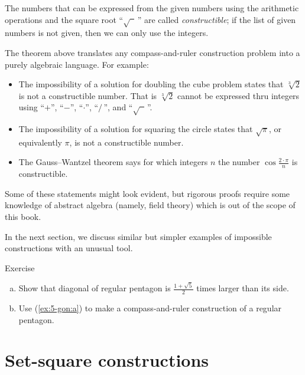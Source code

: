 The numbers that can be expressed from the given numbers using the arithmetic operations and the square root ``$\sqrt{\phantom{a}}\,$'' are called \emph{constructible};
if the list of given numbers is not given, then we can only use the integers.

{\sloppy
The theorem above translates any compass-and-ruler construction problem into a purely algebraic language.
For example:
\begin{itemize}
\item The impossibility of a solution for doubling the cube problem states that $\sqrt[3]{2}$ is not a constructible number.
That is $\sqrt[3]{2}$ cannot be expressed thru integers using
``$+$'', ``$-$'', ``$\cdot$'', ``$/\,$'', and ``$\sqrt{\phantom{a}}\,$''.

\item The impossibility of a solution for squaring the circle states that 
$\sqrt{\pi}$, or equivalently $\pi$, is not a constructible number.

\item The Gauss--Wantzel theorem says for which integers $n$ the number 
$\cos\tfrac{2\cdot\pi}n$ is constructible.
\end{itemize} 
Some of these statements might look evident, 
but rigorous proofs require some knowledge of abstract algebra (namely, field theory)
which is out of the scope of this book. 

}

In the next section, we discuss similar but simpler examples of impossible constructions with an unusual tool.

\begin{thm}{Exercise}\label{ex:5-gon}
\begin{enumerate}[(a)]
 \item\label{ex:5-gon:a} Show that diagonal of regular pentagon is $\tfrac{1+\sqrt5}2$ times larger than its side.
 \item\label{ex:5-gon:b} Use (\ref{ex:5-gon:a}) to make a compass-and-ruler construction of a regular pentagon.
\end{enumerate}
\end{thm}

\section{Set-square constructions}


